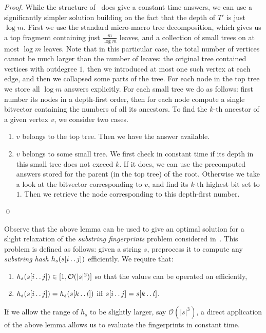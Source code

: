 \documentclass[runningheads]{llncs}
\newcommand{\twodots}{\mathinner{\ldotp\ldotp}}
\begin{document}
\begin{proof}
While the structure of~\cite{BenderAncestor} does give a constant time answers, we can use a significantly simpler solution building on the fact that the depth of $T'$ is just $\log m$. First we use the standard micro-macro tree decomposition, which gives us a top fragment containing just $\frac{m}{\log m}$ leaves, and a collection of small trees on at most $\log m$ leaves. Note that in this particular case, the total number of vertices cannot be much larger than the number of leaves: the original tree contained vertices with outdegree $1$, then we introduced at most one such vertex at each edge, and then we collapsed some parts of the tree. For each node in the top tree we store all $\log m$ answers explicitly. For each small tree we do as follows: first number its nodes in a depth-first order, then for each node compute a single bitvector containing the numbers of all its ancestors. To find the $k$-th ancestor of a given vertex $v$, we consider two cases.
\begin{enumerate}
\item $v$ belongs to the top tree. Then we have the answer available.
\item $v$ belongs to some small tree. We first check in constant time if its depth in this small tree does not exceed $k$. If it does, we can use the precomputed answers stored for the parent (in the top tree) of the root. Otherwise we take a look at the bitvector corresponding to $v$, and find its $k$-th highest bit set to $1$. Then we retrieve the node corresponding to this depth-first number.
\end{enumerate}
\qed
\end{proof}

Observe that the above lemma can be used to give an optimal solution for a slight relaxation of the {\it substring fingerprints} problem considered in~\cite{FarachHashing}. This problem is defined as follows: given a string $s$, preprocess it to compute any {\it substring hash} $h_s(s[i\twodots j])$ efficiently. We require that:
\begin{enumerate}
\item $h_s(s[i\twodots j])\in[1,\mathcal{O}(|s|^2)]$ so that the values can be operated on efficiently,
\item $h_s(s[i\twodots j])=h_s(s[k\twodots l])$ iff $s[i\twodots j]=s[k\twodots l]$.
\end{enumerate}
If we allow the range of $h_s$ to be slightly larger, say $\mathcal{O}(|s|^3)$, a direct application of the above lemma allows us to evaluate the fingerprints in constant time.
\end{document}
